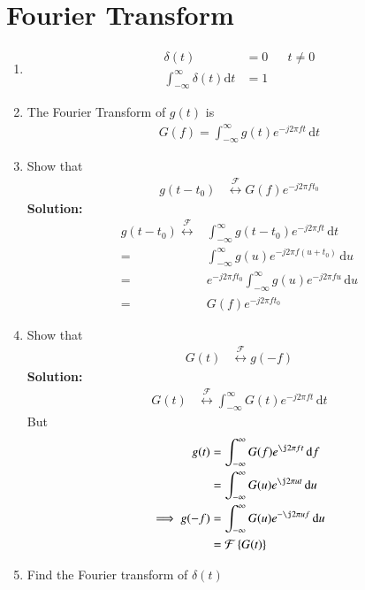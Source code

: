 \documentclass[journal,12pt,twocolumn]{IEEEtran}
\newcommand{\solution}{\noindent \textbf{Solution: }}
\providecommand{\cbrak}[1]{\ensuremath{\left\{#1\right\}}}
\providecommand{\der}[1]{\mathrm{d} #1}
\providecommand{\system}[1]{\overset{\mathcal{#1}}{ \longleftrightarrow}}
\numberwithin{equation}{section}
\numberwithin{figure}{section}
\renewcommand\thesection{\arabic{section}}
\begin{document}
	\section{Fourier Transform}
	\begin{enumerate}[label=\thesection.\arabic*,ref=\thesection.\theenumi]
	\item 
	\begin{align}
		\delta(t) &= 0 && t \ne 0 \\
		\int_{-\infty}^{\infty} \delta(t) \der{t} &= 1
	\end{align}
	
	 \item The Fourier Transform of $g(t)$ is
 	\begin{align}
 		G(f)=\int_{-\infty}^{\infty}g(t)e^{-j2\pi ft}\,\der{t}
 	\end{align}
 	
	\item Show that 
	\begin{align}
		g(t-t_0)&\system{F}G(f)e^{-j2\pi ft_0}
	\end{align}
	\solution 
	\begin{align}
		g(t-t_0) \system{F} &\int_{-\infty}^{\infty}g(t-t_0)e^{-j2\pi ft}\,\der{t} \\
		=& \int_{-\infty}^{\infty}g(u)e^{-j2\pi f(u+t_0)}\,\der{u} \\
		=& e^{-j2\pi ft_0} \int_{-\infty}^{\infty}g(u)e^{-j2\pi fu}\,\der{u} \\
		=& G(f)e^{-j2\pi ft_0}
	\end{align}
	
	\item Show that 
	\begin{align}
		G(t)&\system{F}g(-f)
	\end{align}
	\solution
	\begin{align}
		G(t)&\system{F} \int_{-\infty}^{\infty}G(t)e^{-j2\pi ft}\,\der{t} 
	\end{align}
	But
	\begin{align}
		g(t)&=\int_{-\infty}^{\infty}G(f)e^{\j2\pi ft}\,\der{f} \\
		&= \int_{-\infty}^{\infty}G(u)e^{\j2\pi ut}\,\der{u} \\
		\implies g(-f) &= \int_{-\infty}^{\infty}G(u)e^{-\j2\pi uf}\,\der{u} \\
		&= \mathcal{F}\cbrak{G(t)}
	\end{align}
	
	\item Find the Fourier transform of $\delta(t)$
	

\end{enumerate}
\end{document}
